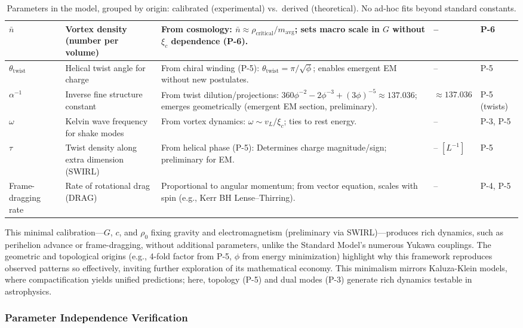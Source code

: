 \begin{table}[H]
\begin{tabularx}{\linewidth}{|p{1.5cm}|p{3cm}|X|p{2cm}|p{2cm}|}
\hline
$\bar{n}$ & Vortex density (number per volume) & From cosmology: $\bar{n} \approx \rho_{\text{critical}} / m_{\text{avg}}$; sets macro scale in $G$ without $\xi_c$ dependence (P-6). & -- & P-6 \\
\hline
$\theta_{\text{twist}}$ & Helical twist angle for charge & From chiral winding (P-5): $\theta_{\text{twist}} = \pi / \sqrt{\phi}$; enables emergent EM without new postulates. & -- & P-5 \\
\hline
$\alpha^{-1}$ & Inverse fine structure constant & From twist dilution/projections: $360 \phi^{-2} - 2 \phi^{-3} + (3 \phi)^{-5} \approx 137.036$; emerges geometrically (emergent EM section, preliminary). & $\approx 137.036$ & P-5 (twists) \\
\hline
$\omega$ & Kelvin wave frequency for shake modes & From vortex dynamics: $\omega \sim v_L / \xi_c$; ties to rest energy. & -- & P-3, P-5 \\
\hline
$\tau$ & Twist density along extra dimension (SWIRL) & From helical phase (P-5): Determines charge magnitude/sign; preliminary for EM. & -- $[L^{-1}]$ & P-5 \\
\hline
Frame-dragging rate & Rate of rotational drag (DRAG) & Proportional to angular momentum; from vector equation, scales with spin (e.g., Kerr BH Lense–Thirring). & -- & P-4, P-5 \\
\hline
\end{tabularx}
\caption{Parameters in the model, grouped by origin: calibrated (experimental) vs.\ derived (theoretical). No ad-hoc fits beyond standard constants.}
\label{tab:parameters}
\end{table}

This minimal calibration---$G$, $c$, and $\rho_0$ fixing gravity and electromagnetism (preliminary via SWIRL)---produces rich dynamics, such as perihelion advance or frame-dragging, without additional parameters, unlike the Standard Model's numerous Yukawa couplings. The geometric and topological origins (e.g., 4-fold factor from P-5, $\phi$ from energy minimization) highlight why this framework reproduces observed patterns so effectively, inviting further exploration of its mathematical economy. This minimalism mirrors Kaluza-Klein models, where compactification yields unified predictions; here, topology (P-5) and dual modes (P-3) generate rich dynamics testable in astrophysics.

\subsubsection{Parameter Independence Verification}

